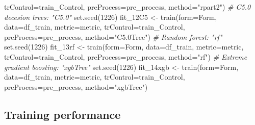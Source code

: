 \documentclass[
]{article}
\newenvironment{Shaded}{\begin{snugshade}}{\end{snugshade}}
\newcommand{\AttributeTok}[1]{\textcolor[rgb]{0.77,0.63,0.00}{#1}}
\newcommand{\CommentTok}[1]{\textcolor[rgb]{0.56,0.35,0.01}{\textit{#1}}}
\newcommand{\DecValTok}[1]{\textcolor[rgb]{0.00,0.00,0.81}{#1}}
\newcommand{\FunctionTok}[1]{\textcolor[rgb]{0.00,0.00,0.00}{#1}}
\newcommand{\NormalTok}[1]{#1}
\newcommand{\OtherTok}[1]{\textcolor[rgb]{0.56,0.35,0.01}{#1}}
\newcommand{\StringTok}[1]{\textcolor[rgb]{0.31,0.60,0.02}{#1}}
\begin{document}
\begin{Shaded}
\begin{Highlighting}[]
                    \AttributeTok{trControl=}\NormalTok{train\_Control, }\AttributeTok{preProcess=}\NormalTok{pre\_process,}
                    \AttributeTok{method=}\StringTok{"rpart2"}\NormalTok{)}
\CommentTok{\# C5.0 decesion trees: "C5.0"}
\FunctionTok{set.seed}\NormalTok{(}\DecValTok{1226}\NormalTok{)}
\NormalTok{fit\_12C5 }\OtherTok{\textless{}{-}} \FunctionTok{train}\NormalTok{(}\AttributeTok{form=}\NormalTok{Form, }\AttributeTok{data=}\NormalTok{df\_train, }\AttributeTok{metric=}\NormalTok{metric,}
                  \AttributeTok{trControl=}\NormalTok{train\_Control, }\AttributeTok{preProcess=}\NormalTok{pre\_process,}
                  \AttributeTok{method=}\StringTok{"C5.0Tree"}\NormalTok{)}
\CommentTok{\# Random forest: "rf"}
\FunctionTok{set.seed}\NormalTok{(}\DecValTok{1226}\NormalTok{)}
\NormalTok{fit\_13rf }\OtherTok{\textless{}{-}} \FunctionTok{train}\NormalTok{(}\AttributeTok{form=}\NormalTok{Form, }\AttributeTok{data=}\NormalTok{df\_train, }\AttributeTok{metric=}\NormalTok{metric,}
                  \AttributeTok{trControl=}\NormalTok{train\_Control, }\AttributeTok{preProcess=}\NormalTok{pre\_process,}
                  \AttributeTok{method=}\StringTok{"rf"}\NormalTok{)}
\CommentTok{\# Extreme gradient boosting: "xgbTree"}
\FunctionTok{set.seed}\NormalTok{(}\DecValTok{1226}\NormalTok{)}
\NormalTok{fit\_14xgb }\OtherTok{\textless{}{-}} \FunctionTok{train}\NormalTok{(}\AttributeTok{form=}\NormalTok{Form, }\AttributeTok{data=}\NormalTok{df\_train, }\AttributeTok{metric=}\NormalTok{metric,}
                   \AttributeTok{trControl=}\NormalTok{train\_Control, }\AttributeTok{preProcess=}\NormalTok{pre\_process,}
                   \AttributeTok{method=}\StringTok{"xgbTree"}\NormalTok{)}
\end{Highlighting}
\end{Shaded}

\hypertarget{training-performance}{%
\subsection{Training performance}\label{training-performance}}
\end{document}
